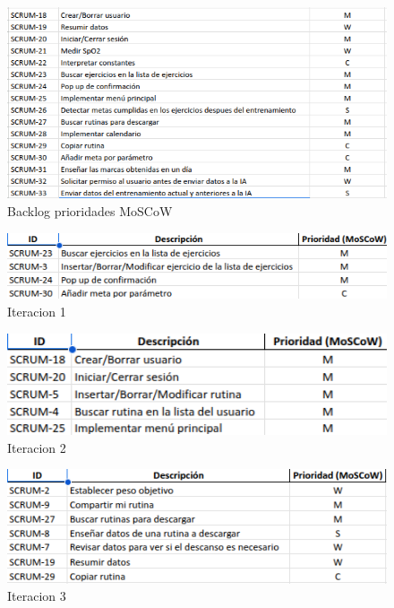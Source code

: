 \begin{landscape}
\begin{figure}[H]
   \centering
    \includegraphics[width=1.5\textwidth]{tablas/backlog2.png}
    \caption{Backlog prioridades MoSCoW}
    \label{fig:backlog2}
\end{figure}
\end{landscape}

\begin{figure}[H]
   \centering
    \includegraphics[width=1.2\textwidth]{tablas/iter1.png}
    \caption{Iteracion 1}
    \label{fig:iter1}
\end{figure}

\begin{figure}[H]
   \centering
    \includegraphics[width=1.1\textwidth]{tablas/iter2.png}
    \caption{Iteracion 2}
    \label{fig:iter2}
\end{figure}

\begin{figure}[H]
   \centering
    \includegraphics[width=1.2\textwidth]{tablas/iter3.png}
    \caption{Iteracion 3}
    \label{fig:iter3}
\end{figure}

